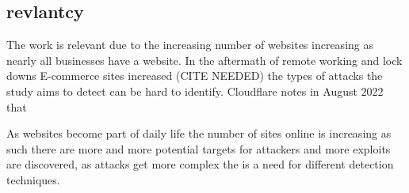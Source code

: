 \subsection{revlantcy}
The work is relevant due to the increasing number of websites increasing as nearly all businesses have a website. In the aftermath of remote working and lock downs E-commerce sites increased (CITE NEEDED) the types of attacks the study aims to detect can be hard to identify. Cloudflare notes in August  2022 that 


As websites become part of daily life the number of sites online is increasing as such there are more and more potential targets for attackers and more exploits are discovered, as attacks get more complex the is a need for different detection techniques.











